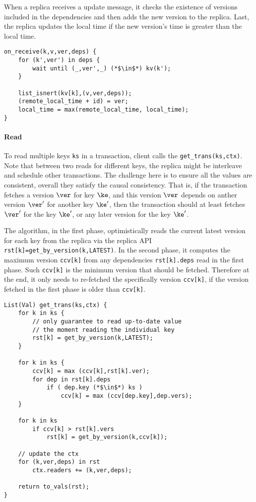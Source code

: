 When a replica receives a update message, it checks the existence of versions included in the dependencies and then adds the new version to the replica.
Last, the replica updates the local time if the new version's time is greater than the local time.


\begin{lstlisting}[caption={Receive update message},label={lst:cops-replica-receive-msg}]
on_receive(k,v,ver,deps) {
    for (k',ver') in deps {
        wait until (_,ver',_) (*$\in$*) kv(k');
    }

    list_isnert(kv[k],(v,ver,deps));
    (remote_local_time + id) = ver;
    local_time = max(remote_local_time, local_time);
}
\end{lstlisting}


\paragraph{\bf Read}
To read multiple keys \verb|ks| in a transaction, client calls the \verb|get_trans(ks,ctx)|.
Note that between two reads for different keys, 
the replica might be interleave and schedule other transactions.
The challenge here is to ensure all the values are consistent, \ie
overall they satisfy the causal consistency.
That is, if the transaction fetches a version \( \ver \) for key \( \ke \),
and this version \( \ver \) depends on anther version \( \ver' \) for another key \( \ke' \), 
then the transaction should at least fetches \( \ver' \) for the key \( \ke' \),
or any later version  for the key \( \ke' \).

The algorithm, in the first phase, optimistically reads the current latest version for each key from the replica via the replica API \verb|rst[k]=get_by_version(k,LATEST)|.
In the second phase, it computes the maximum version \verb|ccv[k]| from any dependencies \verb|rst[k].deps| read in the first phase.
Such \verb|ccv[k]| is the minimum version that should be fetched.
Therefore at the end, it only needs to re-fetched the specifically version \verb|ccv[k]|,
if the version fetched in the first phase is older than \verb|ccv[k]|.

\begin{lstlisting}[caption={Reads},label={lst:cops-client-read}]
List(Val) get_trans(ks,ctx) {
    for k in ks {
        // only guarantee to read up-to-date value 
        // the moment reading the individual key
        rst[k] = get_by_version(k,LATEST);
    }

    for k in ks {
        ccv[k] = max (ccv[k],rst[k].ver);
        for dep in rst[k].deps
            if ( dep.key (*$\in$*) ks )
                ccv[k] = max (ccv[dep.key],dep.vers);
    }

    for k in ks 
        if ccv[k] > rst[k].vers
            rst[k] = get_by_version(k,ccv[k]);

    // update the ctx
    for (k,ver,deps) in rst
        ctx.readers += (k,ver,deps);

    return to_vals(rst);
}                                   
\end{lstlisting}

